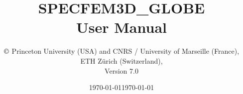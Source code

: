\documentclass[oneside,english]{book}
\date{\today}
\begin{document}
\thispagestyle{empty}
\begin{center}
\vspace*{-1.8truecm}
\noindent{}
\end{center}
%
\title{\thispagestyle{empty}\textbf{SPECFEM3D\_GLOBE}\\
\textbf{User Manual}}
%
\author{$\copyright$ Princeton University (USA) and CNRS / University of Marseille (France),\\
ETH Z\"urich (Switzerland),\\
Version 7.0}

\date{\noindent \today}

\maketitle
\end{document}
